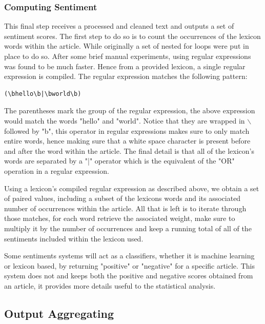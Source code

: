 \subsubsection{Computing Sentiment}

This final step receives a processed and cleaned text and outputs a set of sentiment scores. The first step to do so is to count the occurrences of the lexicon words within the article. While originally a set of nested for loops were put in place to do so. After some brief manual experiments, using regular expressions was found to be much faster. Hence from a provided lexicon, a single regular expression is compiled. The regular expression matches the following pattern:
\begin{center}
\begin{verbatim}(\bhello\b|\bworld\b)\end{verbatim}
\end{center}

The parentheses mark the group of the regular expression, the above expression would match the words "hello" and "world". Notice that they are wrapped in $\backslash$ followed by "b", this operator in regular expressions makes sure to only match entire words, hence making sure that a white space character is present before and after the word within the article. The final detail is that all of the lexicon's words are separated by a "|" operator which is the equivalent of the "OR" operation in a regular expression.

Using a lexicon's compiled regular expression as described above, we obtain a set of paired values, including a subset of the lexicons words and its associated number of occurrences within the article.
All that is left is to iterate through those matches, for each word retrieve the associated weight, make sure to multiply it by the number of occurrences and keep a running total of all of the sentiments included within the lexicon used.

Some sentiments systems will act as a classifiers, whether it is machine learning or lexicon based, by returning "positive" or "negative" for a specific article. This system does not and keeps both the positive and negative scores obtained from an article, it provides more details useful to the statistical analysis.

\subsection{Output Aggregating}\label{chap: output aggregating}


